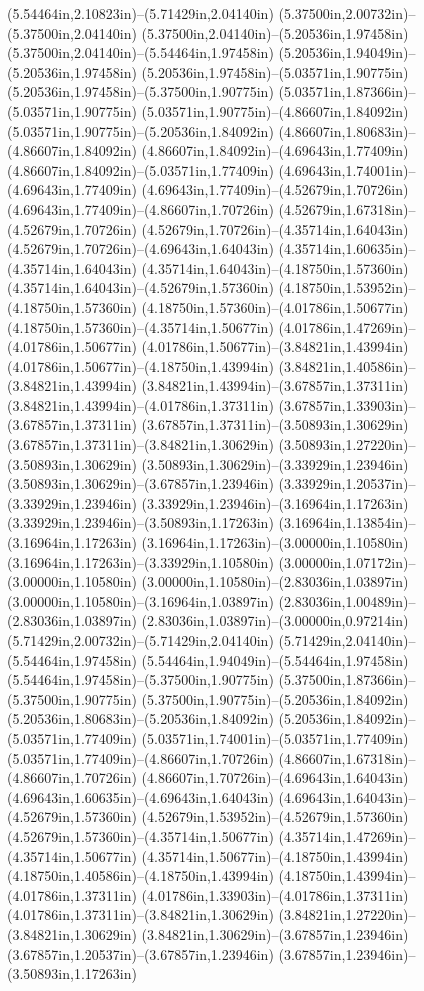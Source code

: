 (5.54464in,2.10823in)--(5.71429in,2.04140in) (5.37500in,2.00732in)--(5.37500in,2.04140in) (5.37500in,2.04140in)--(5.20536in,1.97458in) (5.37500in,2.04140in)--(5.54464in,1.97458in) (5.20536in,1.94049in)--(5.20536in,1.97458in) (5.20536in,1.97458in)--(5.03571in,1.90775in) (5.20536in,1.97458in)--(5.37500in,1.90775in) (5.03571in,1.87366in)--(5.03571in,1.90775in) (5.03571in,1.90775in)--(4.86607in,1.84092in) (5.03571in,1.90775in)--(5.20536in,1.84092in) (4.86607in,1.80683in)--(4.86607in,1.84092in) (4.86607in,1.84092in)--(4.69643in,1.77409in) (4.86607in,1.84092in)--(5.03571in,1.77409in) (4.69643in,1.74001in)--(4.69643in,1.77409in) (4.69643in,1.77409in)--(4.52679in,1.70726in) (4.69643in,1.77409in)--(4.86607in,1.70726in) (4.52679in,1.67318in)--(4.52679in,1.70726in) (4.52679in,1.70726in)--(4.35714in,1.64043in) (4.52679in,1.70726in)--(4.69643in,1.64043in) (4.35714in,1.60635in)--(4.35714in,1.64043in) (4.35714in,1.64043in)--(4.18750in,1.57360in) (4.35714in,1.64043in)--(4.52679in,1.57360in) (4.18750in,1.53952in)--(4.18750in,1.57360in) (4.18750in,1.57360in)--(4.01786in,1.50677in) (4.18750in,1.57360in)--(4.35714in,1.50677in) (4.01786in,1.47269in)--(4.01786in,1.50677in) (4.01786in,1.50677in)--(3.84821in,1.43994in) (4.01786in,1.50677in)--(4.18750in,1.43994in) (3.84821in,1.40586in)--(3.84821in,1.43994in) (3.84821in,1.43994in)--(3.67857in,1.37311in) (3.84821in,1.43994in)--(4.01786in,1.37311in) (3.67857in,1.33903in)--(3.67857in,1.37311in) (3.67857in,1.37311in)--(3.50893in,1.30629in) (3.67857in,1.37311in)--(3.84821in,1.30629in) (3.50893in,1.27220in)--(3.50893in,1.30629in) (3.50893in,1.30629in)--(3.33929in,1.23946in) (3.50893in,1.30629in)--(3.67857in,1.23946in) (3.33929in,1.20537in)--(3.33929in,1.23946in) (3.33929in,1.23946in)--(3.16964in,1.17263in) (3.33929in,1.23946in)--(3.50893in,1.17263in) (3.16964in,1.13854in)--(3.16964in,1.17263in) (3.16964in,1.17263in)--(3.00000in,1.10580in) (3.16964in,1.17263in)--(3.33929in,1.10580in) (3.00000in,1.07172in)--(3.00000in,1.10580in) (3.00000in,1.10580in)--(2.83036in,1.03897in) (3.00000in,1.10580in)--(3.16964in,1.03897in) (2.83036in,1.00489in)--(2.83036in,1.03897in) (2.83036in,1.03897in)--(3.00000in,0.97214in) (5.71429in,2.00732in)--(5.71429in,2.04140in) (5.71429in,2.04140in)--(5.54464in,1.97458in) (5.54464in,1.94049in)--(5.54464in,1.97458in) (5.54464in,1.97458in)--(5.37500in,1.90775in) (5.37500in,1.87366in)--(5.37500in,1.90775in) (5.37500in,1.90775in)--(5.20536in,1.84092in) (5.20536in,1.80683in)--(5.20536in,1.84092in) (5.20536in,1.84092in)--(5.03571in,1.77409in) (5.03571in,1.74001in)--(5.03571in,1.77409in) (5.03571in,1.77409in)--(4.86607in,1.70726in) (4.86607in,1.67318in)--(4.86607in,1.70726in) (4.86607in,1.70726in)--(4.69643in,1.64043in) (4.69643in,1.60635in)--(4.69643in,1.64043in) (4.69643in,1.64043in)--(4.52679in,1.57360in) (4.52679in,1.53952in)--(4.52679in,1.57360in) (4.52679in,1.57360in)--(4.35714in,1.50677in) (4.35714in,1.47269in)--(4.35714in,1.50677in) (4.35714in,1.50677in)--(4.18750in,1.43994in) (4.18750in,1.40586in)--(4.18750in,1.43994in) (4.18750in,1.43994in)--(4.01786in,1.37311in) (4.01786in,1.33903in)--(4.01786in,1.37311in) (4.01786in,1.37311in)--(3.84821in,1.30629in) (3.84821in,1.27220in)--(3.84821in,1.30629in) (3.84821in,1.30629in)--(3.67857in,1.23946in) (3.67857in,1.20537in)--(3.67857in,1.23946in) (3.67857in,1.23946in)--(3.50893in,1.17263in) 